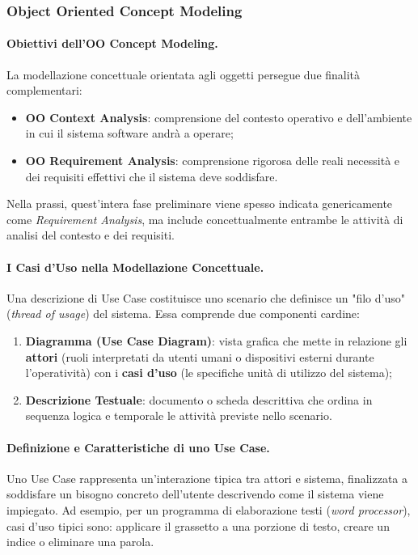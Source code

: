 \documentclass[12pt]{extarticle}
\begin{document}
\subsubsection{Object Oriented Concept Modeling}

\paragraph{Obiettivi dell'OO Concept Modeling.}
La modellazione concettuale orientata agli oggetti persegue due finalità complementari:
\begin{itemize}
    \item \textbf{OO Context Analysis}: comprensione del contesto operativo e dell'ambiente in cui il sistema software andrà a operare;
    \item \textbf{OO Requirement Analysis}: comprensione rigorosa delle reali necessità e dei requisiti effettivi che il sistema deve soddisfare.
\end{itemize}
Nella prassi, quest'intera fase preliminare viene spesso indicata genericamente come \textit{Requirement Analysis}, ma include concettualmente entrambe le attività di analisi del contesto e dei requisiti.

\paragraph{I Casi d'Uso nella Modellazione Concettuale.}
Una descrizione di Use Case costituisce uno scenario che definisce un "filo d'uso" (\textit{thread of usage}) del sistema. Essa comprende due componenti cardine:
\begin{enumerate}
    \item \textbf{Diagramma (Use Case Diagram)}: vista grafica che mette in relazione gli \textbf{attori} (ruoli interpretati da utenti umani o dispositivi esterni durante l'operatività) con i \textbf{casi d'uso} (le specifiche unità di utilizzo del sistema);
    \item \textbf{Descrizione Testuale}: documento o scheda descrittiva che ordina in sequenza logica e temporale le attività previste nello scenario.
\end{enumerate}

\paragraph{Definizione e Caratteristiche di uno Use Case.}
Uno Use Case rappresenta un'interazione tipica tra attori e sistema, finalizzata a soddisfare un bisogno concreto dell'utente descrivendo come il sistema viene impiegato. Ad esempio, per un programma di elaborazione testi (\textit{word processor}), casi d'uso tipici sono: applicare il grassetto a una porzione di testo, creare un indice o eliminare una parola.
\end{document}
